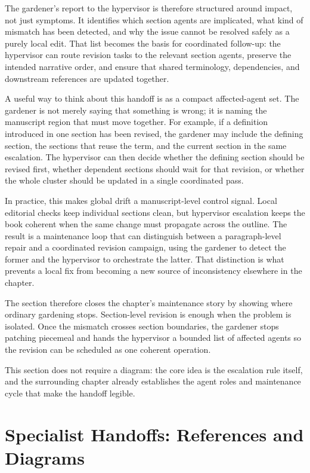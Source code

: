 \documentclass[11pt]{article}
\begin{document}
The gardener's report to the hypervisor is therefore structured around impact, not just symptoms. It identifies which section agents are implicated, what kind of mismatch has been detected, and why the issue cannot be resolved safely as a purely local edit. That list becomes the basis for coordinated follow-up: the hypervisor can route revision tasks to the relevant section agents, preserve the intended narrative order, and ensure that shared terminology, dependencies, and downstream references are updated together.

A useful way to think about this handoff is as a compact affected-agent set. The gardener is not merely saying that something is wrong; it is naming the manuscript region that must move together. For example, if a definition introduced in one section has been revised, the gardener may include the defining section, the sections that reuse the term, and the current section in the same escalation. The hypervisor can then decide whether the defining section should be revised first, whether dependent sections should wait for that revision, or whether the whole cluster should be updated in a single coordinated pass.

In practice, this makes global drift a manuscript-level control signal. Local editorial checks keep individual sections clean, but hypervisor escalation keeps the book coherent when the same change must propagate across the outline. The result is a maintenance loop that can distinguish between a paragraph-level repair and a coordinated revision campaign, using the gardener to detect the former and the hypervisor to orchestrate the latter. That distinction is what prevents a local fix from becoming a new source of inconsistency elsewhere in the chapter.

The section therefore closes the chapter's maintenance story by showing where ordinary gardening stops. Section-level revision is enough when the problem is isolated. Once the mismatch crosses section boundaries, the gardener stops patching piecemeal and hands the hypervisor a bounded list of affected agents so the revision can be scheduled as one coherent operation.

This section does not require a diagram: the core idea is the escalation rule itself, and the surrounding chapter already establishes the agent roles and maintenance cycle that make the handoff legible.



\section{Specialist Handoffs: References and Diagrams}
\end{document}
